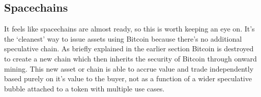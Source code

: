 \subsection{Spacechains}
It feels like spacechains are almost ready, so this is worth keeping an eye on. It's the `cleanest' way to issue assets using Bitcoin because there's no additional speculative chain. As briefly explained in the earlier section Bitcoin is destroyed to create a new chain which then inherits the security of Bitcoin through onward mining. This new asset or chain is able to accrue value and trade independently based purely on it's value to the buyer, not as a function of a wider speculative bubble attached to a token with multiple use cases.
